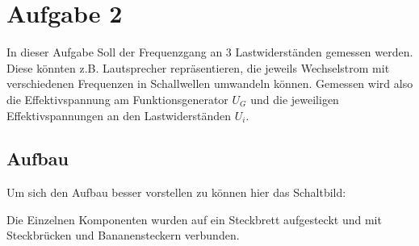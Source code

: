 \section{Aufgabe 2}
In dieser Aufgabe Soll der Frequenzgang an 3 Lastwiderständen gemessen werden. Diese könnten z.B. Lautsprecher repräsentieren, die jeweils Wechselstrom mit verschiedenen Frequenzen in Schallwellen umwandeln können. Gemessen wird also die Effektivspannung am Funktionsgenerator \(U_G\) und die jeweiligen Effektivspannungen an den Lastwiderständen \(U_i\). 
\subsection{Aufbau}
Um sich den Aufbau besser vorstellen zu können hier das Schaltbild:
\begin{center}
\begin{minipage}{\linewidth}
\centering
{}
%
\label{frequenzweiche_schaltplan}
\end{minipage}
\end{center}
Die Einzelnen Komponenten wurden auf ein Steckbrett aufgesteckt und mit Steckbrücken und Bananensteckern verbunden.
\begin{center}
\begin{minipage}{\linewidth}
\centering
{}
%
\label{frequenzweiche_aufbau}
\end{minipage}
\end{center}

